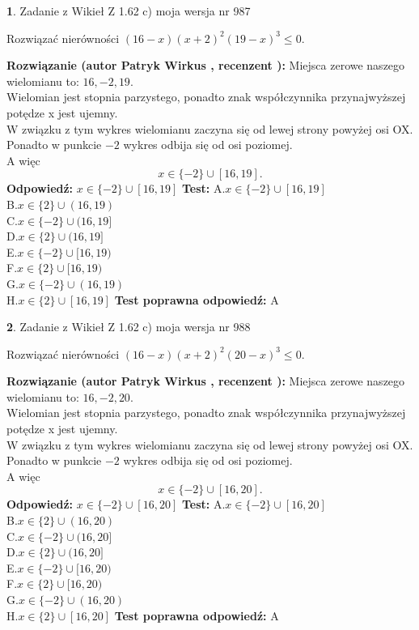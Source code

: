 \documentclass[12pt, a4paper]{article}
\theoremstyle{definition} %
\newtheorem{zad}{}
\newcommand{\zadStart}[1]{\begin{zad}#1\newline}
\newcommand{\zadStop}{\end{zad}}
\newcommand{\rozwStart}[2]{\noindent \textbf{Rozwiązanie (autor #1 , recenzent #2): }\newline}
\newcommand{\rozwStop}{\newline}
\newcommand{\odpStart}{\noindent \textbf{Odpowiedź:}\newline}
\newcommand{\odpStop}{\newline}
\newcommand{\testStart}{\noindent \textbf{Test:}\newline}
\newcommand{\testStop}{\newline}
\newcommand{\kluczStart}{\noindent \textbf{Test poprawna odpowiedź:}\newline}
\newcommand{\kluczStop}{\newline}
\begin{document}
\zadStart{Zadanie z Wikieł Z 1.62 c) moja wersja nr 987}

Rozwiązać nierówności $(16-x)(x+2)^{2}(19-x)^{3}\le0$.
\zadStop
\rozwStart{Patryk Wirkus}{}
Miejsca zerowe naszego wielomianu to: $16, -2, 19$.\\
Wielomian jest stopnia parzystego, ponadto znak współczynnika przy\linebreak najwyższej potędze x jest ujemny.\\ W związku z tym wykres wielomianu zaczyna się od lewej strony powyżej osi OX.\\
Ponadto w punkcie $-2$ wykres odbija się od osi poziomej.\\
A więc $$x \in \{-2\} \cup [16,19].$$
\rozwStop
\odpStart
$x \in \{-2\} \cup [16,19]$
\odpStop
\testStart
A.$x \in \{-2\} \cup [16,19]$\\
B.$x \in \{2\} \cup (16,19)$\\
C.$x \in \{-2\} \cup (16,19]$\\
D.$x \in \{2\} \cup (16,19]$\\
E.$x \in \{-2\} \cup [16,19)$\\
F.$x \in \{2\} \cup [16,19)$\\
G.$x \in \{-2\} \cup (16,19)$\\
H.$x \in \{2\} \cup [16,19]$
\testStop
\kluczStart
A
\kluczStop



\zadStart{Zadanie z Wikieł Z 1.62 c) moja wersja nr 988}

Rozwiązać nierówności $(16-x)(x+2)^{2}(20-x)^{3}\le0$.
\zadStop
\rozwStart{Patryk Wirkus}{}
Miejsca zerowe naszego wielomianu to: $16, -2, 20$.\\
Wielomian jest stopnia parzystego, ponadto znak współczynnika przy\linebreak najwyższej potędze x jest ujemny.\\ W związku z tym wykres wielomianu zaczyna się od lewej strony powyżej osi OX.\\
Ponadto w punkcie $-2$ wykres odbija się od osi poziomej.\\
A więc $$x \in \{-2\} \cup [16,20].$$
\rozwStop
\odpStart
$x \in \{-2\} \cup [16,20]$
\odpStop
\testStart
A.$x \in \{-2\} \cup [16,20]$\\
B.$x \in \{2\} \cup (16,20)$\\
C.$x \in \{-2\} \cup (16,20]$\\
D.$x \in \{2\} \cup (16,20]$\\
E.$x \in \{-2\} \cup [16,20)$\\
F.$x \in \{2\} \cup [16,20)$\\
G.$x \in \{-2\} \cup (16,20)$\\
H.$x \in \{2\} \cup [16,20]$
\testStop
\kluczStart
A
\kluczStop
\end{document}
